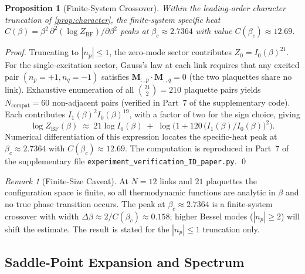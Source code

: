 \documentclass[12pt, a4paper]{article}
\theoremstyle{plain}
\newtheorem{proposition}[theorem]{Proposition}
\theoremstyle{definition}
\theoremstyle{remark}
\newtheorem{remark}[theorem]{Remark}
\newcommand{\Cstar}{\beta_c}
\newcommand{\Mmat}{\mathbf{M}}
\newcommand{\ZBF}{Z_{\mathrm{BF}}}
\begin{document}
\begin{proposition}[Finite-System Crossover]\label{prop:crossover}
Within the leading-order character truncation of
\cref{prop:character}, the finite-system specific heat
$C(\beta) = \beta^2\,\partial^2(\log\ZBF)/\partial\beta^2$
peaks at $\Cstar\approx 2.7364$ with value $C(\Cstar)\approx 12.69$.
\end{proposition}

\begin{proof}
Truncating to $|n_p|\leq 1$, the zero-mode sector contributes
$Z_0 = I_0(\beta)^{21}$.
For the single-excitation sector, Gauss's law at each link requires
that any excited pair $(n_p=+1, n_q=-1)$ satisfies $\Mmat_{:,p}\cdot\Mmat_{:,q}=0$
(the two plaquettes share no link).
Exhaustive enumeration of all $\binom{21}{2}=210$ plaquette pairs yields
$N_\mathrm{compat}=60$ non-adjacent pairs (verified in Part~7 of the
supplementary code).
Each contributes $I_1(\beta)^2 I_0(\beta)^{19}$, with a factor of two
for the sign choice, giving
\[
  \log \ZBF(\beta)
  \;\approx\;
  21\log I_0(\beta)
  \;+\;
  \log\!\bigl(1 + 120\,\bigl(I_1(\beta)/I_0(\beta)\bigr)^2\bigr).
\]
Numerical differentiation of this expression locates the specific-heat
peak at $\Cstar\approx 2.7364$ with $C(\Cstar)\approx 12.69$.
The computation is reproduced in Part~7 of the supplementary file
\texttt{experiment\_verification\_ID\_paper.py}.
\qed
\end{proof}

\begin{remark}[Finite-Size Caveat]\label{rem:finite}
At $N=12$ links and $21$ plaquettes the configuration space
is finite, so all thermodynamic functions are analytic in $\beta$
and no true phase transition occurs.
The peak at $\Cstar\approx 2.7364$ is a finite-system crossover
with width $\Delta\beta \approx 2/C(\Cstar) \approx 0.158$;
higher Bessel modes ($|n_p|\geq2$) will shift the estimate.
The result is stated for the $|n_p|\leq1$ truncation only.
\end{remark}

\subsection{Saddle-Point Expansion and Spectrum}
\end{document}
